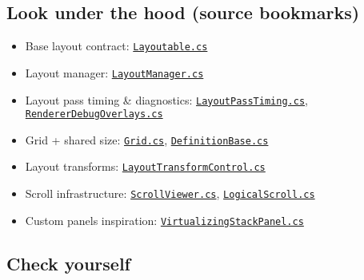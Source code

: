 \subsection{Look under the hood (source
bookmarks)}\label{look-under-the-hood-source-bookmarks-3}

\begin{itemize}
\tightlist
\item
  Base layout contract:
  \href{https://github.com/AvaloniaUI/Avalonia/blob/master/src/Avalonia.Base/Layout/Layoutable.cs}{\passthrough{\lstinline!Layoutable.cs!}}
\item
  Layout manager:
  \href{https://github.com/AvaloniaUI/Avalonia/blob/master/src/Avalonia.Base/Layout/LayoutManager.cs}{\passthrough{\lstinline!LayoutManager.cs!}}
\item
  Layout pass timing \& diagnostics:
  \href{https://github.com/AvaloniaUI/Avalonia/blob/master/src/Avalonia.Base/Layout/LayoutPassTiming.cs}{\passthrough{\lstinline!LayoutPassTiming.cs!}},
  \href{https://github.com/AvaloniaUI/Avalonia/blob/master/src/Avalonia.Base/Rendering/RendererDebugOverlays.cs}{\passthrough{\lstinline!RendererDebugOverlays.cs!}}
\item
  Grid + shared size:
  \href{https://github.com/AvaloniaUI/Avalonia/blob/master/src/Avalonia.Controls/Grid.cs}{\passthrough{\lstinline!Grid.cs!}},
  \href{https://github.com/AvaloniaUI/Avalonia/blob/master/src/Avalonia.Controls/DefinitionBase.cs}{\passthrough{\lstinline!DefinitionBase.cs!}}
\item
  Layout transforms:
  \href{https://github.com/AvaloniaUI/Avalonia/blob/master/src/Avalonia.Controls/LayoutTransformControl.cs}{\passthrough{\lstinline!LayoutTransformControl.cs!}}
\item
  Scroll infrastructure:
  \href{https://github.com/AvaloniaUI/Avalonia/blob/master/src/Avalonia.Controls/ScrollViewer.cs}{\passthrough{\lstinline!ScrollViewer.cs!}},
  \href{https://github.com/AvaloniaUI/Avalonia/blob/master/src/Avalonia.Controls/LogicalScroll.cs}{\passthrough{\lstinline!LogicalScroll.cs!}}
\item
  Custom panels inspiration:
  \href{https://github.com/AvaloniaUI/Avalonia/blob/master/src/Avalonia.Controls/VirtualizingStackPanel.cs}{\passthrough{\lstinline!VirtualizingStackPanel.cs!}}
\end{itemize}

\subsection{Check yourself}\label{check-yourself-3}

